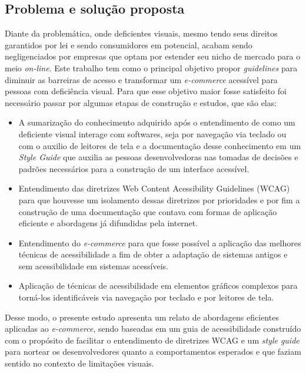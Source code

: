 \subsection{Problema e solução proposta}
{Diante da problemática, onde deficientes visuais, mesmo tendo seus direitos garantidos por lei \cite{brasil2015} e sendo consumidores em potencial, acabam sendo negligenciados por empresas que optam por estender seu nicho de mercado para o  meio \textit{on-line}. Este trabalho tem como o principal objetivo propor \textit{guidelines} para diminuir as barreiras de acesso e transformar um \textit{e-commerce} acessível para pessoas com deficiência visual. Para que esse objetivo maior fosse satisfeito foi necessário passar por algumas etapas de construção e estudos, que são elas:   

\begin{itemize}
    \item A sumarização do conhecimento adquirido após o entendimento de como um deficiente visual interage com softwares, seja por navegação via teclado ou com o auxilio de leitores de tela e a documentação desse conhecimento em um \textit{Style Guide} \cite{lynch2016web} que auxilia as pessoas desenvolvedoras nas tomadas de decisões e padrões necessários para a construção de um interface acessível. 
    \item Entendimento das diretrizes Web Content Acessibility Guidelines (WCAG) \cite{WCAG21} para que houvesse um isolamento dessas diretrizes por prioridades e por fim a construção de uma documentação que contava com formas de aplicação eficiente e abordagens já difundidas pela internet.  
    \item Entendimento do \textit{e-commerce} para que fosse possível a aplicação das melhores técnicas de acessibilidade a fim de obter a adaptação de sistemas antigos e sem acessibilidade em sistemas acessíveis.  
    \item Aplicação de técnicas de acessibilidade em elementos gráficos complexos para torná-los identificáveis via navegação por teclado e por leitores de tela. 


\end{itemize}
 
 Desse modo, o presente estudo apresenta um relato de abordagens eficientes aplicadas ao \textit{e-commerce}, sendo baseadas em um guia de acessibilidade construído com o propósito de facilitar o entendimento de diretrizes WCAG e um \textit{style guide} para nortear os desenvolvedores quanto a comportamentos esperados e que faziam sentido no contexto de limitações visuais. 
}
